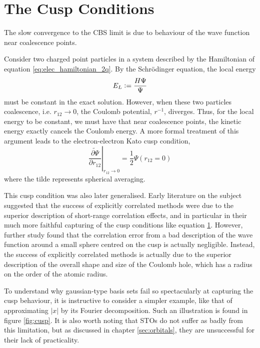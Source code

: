 \section{The Cusp Conditions}
\label{sec:cusp}

The slow convergence to the \gls{CBS} limit is due to behaviour of the wave function near coalescence points. 

Consider two charged point particles in a system described by the Hamiltonian of equation \eqref{eq:elec_hamiltonian_2q}. By the Schr\"odinger equation, the local energy
\begin{equation}
    E_L\mathrel{\mathop:}= \frac{H\Psi}{\Psi}
\end{equation}
must be constant in the exact solution. However, when these two particles coalescence, i.e. $r_{12}\to 0$, the Coulomb potential, $r^{-1}$, diverges. Thus, for the local energy to be constant, we must have that near coalescence points, the kinetic energy exactly cancels the Coulomb energy. A more formal treatment of this argument leads to the electron-electron Kato cusp condition,\cite{katoEigenfunctionsManyparticleSystems1957a}
\begin{equation}
    \label{eq:cusp}
    \left.\widetilde{\frac{\partial \Psi}{\partial r_{12}}}\right|_{r_{12}\to 0}
    = \frac 12 \Psi(r_{12}=0)
\end{equation}
where the tilde represents spherical averaging.

This cusp condition was also later generalised.\cite{packCuspConditionsMolecular1966,kurokawaChapterTwoGeneral2016}
Early literature on the subject suggested that the success of explicitly correlated methods were due to the superior description of short-range correlation effects, and in particular in their much more faithful capturing of the cusp conditions like equation \ref{sec:cusp}.\cite{roothaanAnalytical1960,watsonApproximate1960,weissConfiguration1961,schwartzGround1962}
However, further study found that the correlation error from a bad description of the wave function around a small sphere centred on the cusp is actually negligible.\cite{coulsonElectron1961,gilbertInterpretation1963,prendergastImpact2001,klopperR122007} Instead, the success of explicitly correlated methods is actually due to the superior description of the overall shape and size of the Coulomb hole, which has a radius on the order of the atomic radius.

To understand why gaussian-type basis sets fail so spectacularly at capturing the cusp behaviour, it is instructive to consider a simpler example, like that of approximating $|x|$ by its Fourier decomposition. Such an illustration is found in figure \ref{fig:cusp}. It is also worth noting that \glspl{STO} do not suffer as badly from this limitation\cite{kongExplicitly2012}, but as discussed in chapter \ref{sec:orbitals}, they are unsuccessful for their lack of practicality.

